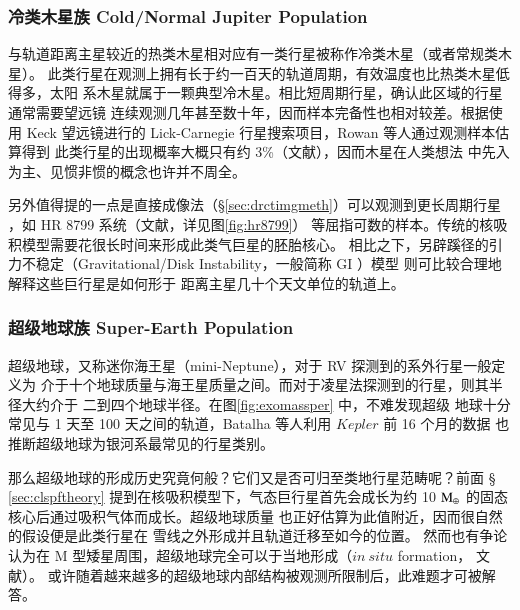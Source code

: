 \subsubsection{冷类木星族  Cold/Normal Jupiter Population}

与轨道距离主星较近的热类木星相对应有一类行星被称作冷类木星（或者常规类木星）。
此类行星在观测上拥有长于约一百天的轨道周期，有效温度也比热类木星低得多，太阳
系木星就属于一颗典型冷木星。相比短周期行星，确认此区域的行星通常需要望远镜
连续观测几年甚至数十年，因而样本完备性也相对较差\cite{Cumming2008}。根据使用
 Keck 望远镜进行的 Lick-Carnegie 行星搜索项目，Rowan 等人通过观测样本估算得到
此类行星的出现概率大概只有约 3\%（文献），因而木星在人类想法
中先入为主、见惯非惯的概念也许并不周全。

另外值得提的一点是直接成像法（\S \ref{sec:drctimgmeth}）可以观测到更长周期行星
，如 HR 8799 系统（文献，详见图\ref{fig:hr8799}）
等屈指可数的样本。传统的核吸积模型需要花很长时间来形成此类气巨星的胚胎核心。
相比之下，另辟蹊径的引力不稳定（Gravitational/Disk Instability，一般简称 GI ）模型
\cite{Kuiper1951,Cameron1978,Boss1997}则可比较合理地解释这些巨行星是如何形于
距离主星几十个天文单位的轨道上\cite{Durisen2007}。



\subsubsection{超级地球族  Super-Earth Population}

超级地球，又称迷你海王星（mini-Neptune），对于 RV 探测到的系外行星一般定义为
介于十个地球质量与海王星质量之间。而对于凌星法探测到的行星，则其半径大约介于
二到四个地球半径\cite{Haghighipour2011}。在图\ref{fig:exomassper} 中，不难发现超级
地球十分常见与 1 天至 100 天之间的轨道，Batalha 等人利用 $Kepler$ 前 16 个月的数据
也推断超级地球为银河系最常见的行星类别\cite{Batalha2013}。

那么超级地球的形成历史究竟何般？它们又是否可归至类地行星范畴呢？前面 \S 
\ref{sec:clspftheory} 提到在核吸积模型下，气态巨行星首先会成长为约 10 
$\mathrm{M}_\oplus$ 的固态核心后通过吸积气体而成长\cite{Guillot2005}。超级地球质量
也正好估算为此值附近\cite{Lissauer2011MRR}，因而很自然的假设便是此类行星在
雪线之外形成并且轨道迁移至如今的位置\cite{Terquem2007,Kennedy2008,IdaLin2008}。
然而也有争论认为在 M 型矮星周围，超级地球完全可以于当地形成（$in\:situ$ formation，
文献）。
或许随着越来越多的超级地球内部结构被观测所限制后，此难题才可被解答\cite{Lissauer2014}。

